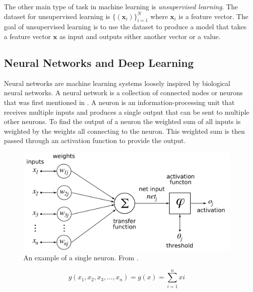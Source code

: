 \documentclass[nofilelist]{cslthse-msc}
\begin{document}
The other main type of task in machine learning is \textit{unsupervised learning}. The dataset for unsupervised learning is $\{ (\mathbf{x}_i)\}_{i=1}^N$ where $\mathbf{x}_i$ is a feature vector. The goal of unsupervised learning is to use the dataset to produce a model that takes a feature vector $\mathbf{x}$ as input and outputs either another vector or a value. 





\subsection{Neural Networks and Deep Learning}

Neural networks are machine learning systems loosely inspired by biological neural networks. A neural network is a collection of connected nodes or neurons that was first mentioned in \citet{mcculloch1943}. A neuron \citep{dawson1998ann} is an information-processing unit that receives multiple inputs and produces a single output that can be sent to multiple other neurons. To find the output of a neuron the weighted sum of all inputs is weighted by the weights all connecting to the neuron. This weighted sum is then passed through an activation function to provide the output.




\begin{figure}[htp]
    \centering
    \includegraphics[width=12cm]{msccls/explanatory_images/neuron_new.png}
    \caption{An example of a single neuron. From \citet{wiki:neuron_image}.}
    \label{fig:neuron}
\end{figure}


\begin{equation}
    g(x_1, x_2, x_3,...,x_n) = g(x) = \sum_{i=1}^n  xi
\end{equation}
\end{document}
